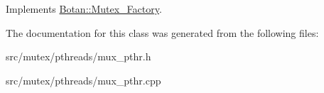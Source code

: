 Implements \hyperlink{classBotan_1_1Mutex__Factory_ade19d854cd215d263ebb3654728322db}{Botan\-::\-Mutex\-\_\-\-Factory}.



The documentation for this class was generated from the following files\-:\begin{DoxyCompactItemize}
\item 
src/mutex/pthreads/mux\-\_\-pthr.\-h\item 
src/mutex/pthreads/mux\-\_\-pthr.\-cpp\end{DoxyCompactItemize}
